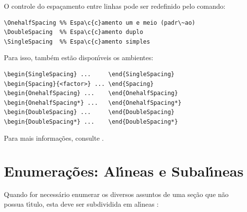 O controle do espa\c{c}amento entre linhas pode ser redefinido pelo comando:

\begin{SingleSpacing}%
\begin{verbatim}
\OnehalfSpacing %% Espa\c{c}amento um e meio (padr\~ao)
\DoubleSpacing  %% Espa\c{c}amento duplo
\SingleSpacing  %% Espa\c{c}amento simples
\end{verbatim}
\end{SingleSpacing}

Para isso, tamb\'em est\~ao dispon\'{\i}veis os ambientes:

\begin{SingleSpacing}%
\begin{verbatim}
\begin{SingleSpacing} ...     \end{SingleSpacing}
\begin{Spacing}{<factor>} ... \end{Spacing}
\begin{OnehalfSpacing} ...    \end{OnehalfSpacing}
\begin{OnehalfSpacing*} ...   \end{OnehalfSpacing*}
\begin{DoubleSpacing} ...     \end{DoubleSpacing}
\begin{DoubleSpacing*} ...    \end{DoubleSpacing*}
\end{verbatim}
\end{SingleSpacing}

Para mais informa\c{c}\~oes, consulte .

\section{Enumera\c{c}\~oes: Al\'{\i}neas e Subal\'{\i}neas}\label{sec:enumeracoes}

Quando for necess\'ario enumerar os diversos assuntos de uma se\c{c}\~ao que n\~ao possua t\'{\i}tulo, esta deve ser subdividida em al\'{\i}neas \cite[subse\c{c}\~ao~4.2]{NBR6024:2012}:

